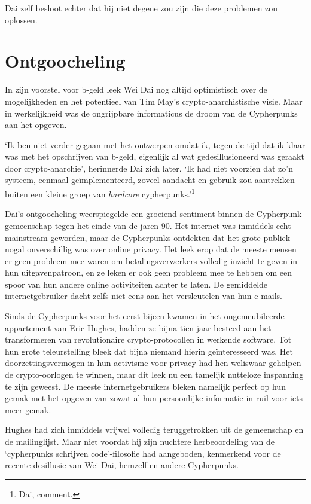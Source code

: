 \documentclass[smalldemyvopaper,11pt,twoside,onecolumn,openright,extrafontsizes,hidelinks]{memoir}
\begin{document}
Dai zelf besloot echter dat hij niet degene zou zijn die deze problemen
zou oplossen.

\section{Ontgoocheling}\label{ontgoocheling}

In zijn voorstel voor b-geld leek Wei Dai nog altijd optimistisch over
de mogelijkheden en het potentieel van Tim May's crypto-anarchistische
visie. Maar in werkelijkheid was de ongrijpbare informaticus de droom
van de Cypherpunks aan het opgeven.

`Ik ben niet verder gegaan met het ontwerpen omdat ik, tegen de tijd dat
ik klaar was met het opschrijven van b-geld, eigenlijk al wat
gedesillusioneerd was geraakt door crypto-anarchie', herinnerde Dai zich
later. `Ik had niet voorzien dat zo'n systeem, eenmaal geïmplementeerd,
zoveel aandacht en gebruik zou aantrekken buiten een kleine groep van
\emph{hardcore} cypherpunks.'\footnote{Dai, comment.}

Dai's ontgoocheling weerspiegelde een groeiend sentiment binnen de
Cypherpunk-gemeenschap tegen het einde van de jaren 90. Het internet was
inmiddels echt mainstream geworden, maar de Cypherpunks ontdekten dat
het grote publiek nogal onverschillig was over online privacy. Het leek
erop dat de meeste mensen er geen probleem mee waren om
betalingsverwerkers volledig inzicht te geven in hun uitgavenpatroon, en
ze leken er ook geen probleem mee te hebben om een
\hspace{0pt}\hspace{0pt}spoor van hun andere online activiteiten achter
te laten. De gemiddelde internetgebruiker dacht zelfs niet eens aan het
versleutelen van hun e-mails.

Sinds de Cypherpunks voor het eerst bijeen kwamen in het ongemeubileerde
appartement van Eric Hughes, hadden ze bijna tien jaar besteed aan het
transformeren van revolutionaire crypto-protocollen in werkende
software. Tot hun grote teleurstelling bleek dat bijna niemand hierin
geïnteresseerd was. Het doorzettingsvermogen in hun activisme voor
privacy had hen weliswaar geholpen de crypto-oorlogen te winnen, maar
dit leek nu een tamelijk nutteloze inspanning te zijn geweest. De meeste
internetgebruikers bleken namelijk perfect op hun gemak met het opgeven
van zowat al hun persoonlijke informatie in ruil voor iets meer gemak.

Hughes had zich inmiddels vrijwel volledig teruggetrokken uit de
gemeenschap en de mailinglijst. Maar niet voordat hij zijn nuchtere
herbeoordeling van de `cypherpunks schrijven code'-filosofie had
aangeboden, kenmerkend voor de recente desillusie van Wei Dai, hemzelf
en andere Cypherpunks.
\end{document}
